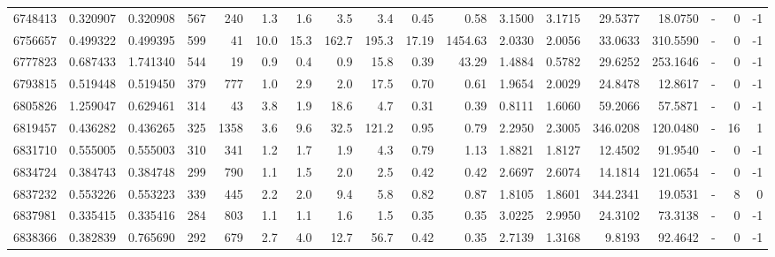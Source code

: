 \begin{tabular}{rrrrrrrrrrrrrrrlrr}
   6748413 & 0.320907 &   0.320908 &  567 &  240 &      1.3 &      1.6 &     3.5 &      3.4 &       0.45 &        0.58 &  3.1500 &  3.1715 &   29.5377 &   18.0750 &             - &        0 &         -1 \\
   6756657 & 0.499322 &   0.499395 &  599 &   41 &     10.0 &     15.3 &   162.7 &    195.3 &      17.19 &     1454.63 &  2.0330 &  2.0056 &   33.0633 &  310.5590 &             - &        0 &         -1 \\
   6777823 & 0.687433 &   1.741340 &  544 &   19 &      0.9 &      0.4 &     0.9 &     15.8 &       0.39 &       43.29 &  1.4884 &  0.5782 &   29.6252 &  253.1646 &             - &        0 &         -1 \\
   6793815 & 0.519448 &   0.519450 &  379 &  777 &      1.0 &      2.9 &     2.0 &     17.5 &       0.70 &        0.61 &  1.9654 &  2.0029 &   24.8478 &   12.8617 &             - &        0 &         -1 \\
   6805826 & 1.259047 &   0.629461 &  314 &   43 &      3.8 &      1.9 &    18.6 &      4.7 &       0.31 &        0.39 &  0.8111 &  1.6060 &   59.2066 &   57.5871 &             - &        0 &         -1 \\
   6819457 & 0.436282 &   0.436265 &  325 & 1358 &      3.6 &      9.6 &    32.5 &    121.2 &       0.95 &        0.79 &  2.2950 &  2.3005 &  346.0208 &  120.0480 &             - &       16 &          1 \\
   6831710 & 0.555005 &   0.555003 &  310 &  341 &      1.2 &      1.7 &     1.9 &      4.3 &       0.79 &        1.13 &  1.8821 &  1.8127 &   12.4502 &   91.9540 &             - &        0 &         -1 \\
   6834724 & 0.384743 &   0.384748 &  299 &  790 &      1.1 &      1.5 &     2.0 &      2.5 &       0.42 &        0.42 &  2.6697 &  2.6074 &   14.1814 &  121.0654 &             - &        0 &         -1 \\
   6837232 & 0.553226 &   0.553223 &  339 &  445 &      2.2 &      2.0 &     9.4 &      5.8 &       0.82 &        0.87 &  1.8105 &  1.8601 &  344.2341 &   19.0531 &             - &        8 &          0 \\
   6837981 & 0.335415 &   0.335416 &  284 &  803 &      1.1 &      1.1 &     1.6 &      1.5 &       0.35 &        0.35 &  3.0225 &  2.9950 &   24.3102 &   73.3138 &             - &        0 &         -1 \\
   6838366 & 0.382839 &   0.765690 &  292 &  679 &      2.7 &      4.0 &    12.7 &     56.7 &       0.42 &        0.35 &  2.7139 &  1.3168 &    9.8193 &   92.4642 &             - &        0 &         -1 \\

\end{tabular}
